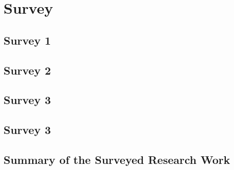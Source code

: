 \documentclass[10pt]{llncs}
\begin{document}
%
\section{Survey}


%
\subsection{Survey 1}






%
\subsection{Survey 2}






%
\subsection{Survey 3}






%
\subsection{Survey 3}






%
\subsection{Summary of the Surveyed Research Work}
\end{document}
